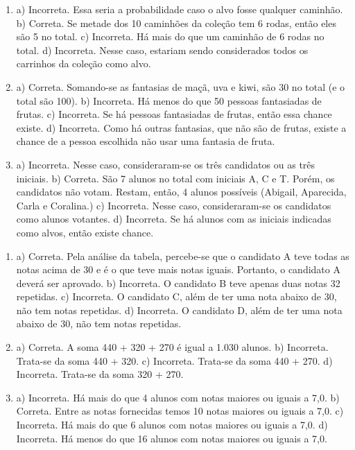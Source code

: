 \begin{enumerate}
\item
a) Incorreta. Essa seria a probabilidade caso o alvo fosse qualquer caminhão.
b) Correta. Se metade dos 10 caminhões da coleção tem 6 rodas, então eles são 5 no total.
c) Incorreta. Há mais do que um caminhão de 6 rodas no total.
d) Incorreta. Nesse caso, estariam sendo considerados todos os carrinhos da coleção como alvo.

\item
a) Correta. Somando-se as fantasias de maçã, uva e kiwi, são 30 no total (e o total são 100).
b) Incorreta. Há menos do que 50 pessoas fantasiadas de frutas.
c) Incorreta. Se há pessoas fantasiadas de frutas, então essa chance existe.
d) Incorreta. Como há outras fantasias, que não são de frutas, existe a chance de a pessoa escolhida não usar uma fantasia de fruta.

\item
a) Incorreta. Nesse caso, consideraram-se os três candidatos ou as três iniciais.
b) Correta. São 7 alunos no total com iniciais A, C e T. Porém, os candidatos não votam. Restam, então, 4 alunos possíveis (Abigail, Aparecida, Carla e Coralina.)
c) Incorreta. Nesse caso, consideraram-se os candidatos como alunos votantes.
d) Incorreta. Se há alunos com as iniciais indicadas como alvos, então existe chance.
\end{enumerate}


\begin{enumerate}
\item
a) Correta. Pela análise da tabela, percebe-se que o candidato A teve todas as notas
acima de 30 e é o que teve mais notas iguais. Portanto, o candidato A
deverá ser aprovado.
b) Incorreta. O candidato B teve apenas duas notas 32 repetidas.
c) Incorreta. O candidato C, além de ter uma nota abaixo de 30, não tem notas repetidas.
d) Incorreta. O candidato D, além de ter uma nota abaixo de 30, não tem notas repetidas.

\item
a) Correta.  A soma 440 + 320 + 270 é igual a 1.030 alunos.
b) Incorreta. Trata-se da soma 440 + 320.
c) Incorreta. Trata-se da soma 440 + 270.
d) Incorreta. Trata-se da soma 320 + 270.

\item
a) Incorreta. Há mais do que 4 alunos com notas maiores ou iguais a 7,0.
b) Correta. Entre as notas fornecidas temos 10 notas maiores ou iguais a 7,0.
c) Incorreta. Há mais do que 6 alunos com notas maiores ou iguais a 7,0.
d) Incorreta. Há menos do que 16 alunos com notas maiores ou iguais a 7,0.
\end{enumerate}

